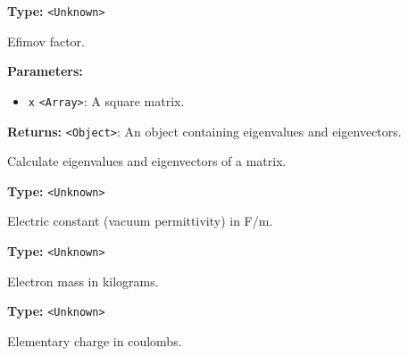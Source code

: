 \documentclass[12pt,a4paper]{article}
\begin{document}
\vspace{5mm}
\noindent {}\vspace{4mm}


\noindent \textbf{Type:} \texttt{<Unknown>}

\noindent Efimov factor.

\vspace{5mm}
\noindent {}


\noindent \textbf{Parameters:}
\begin{itemize}
  \item \texttt{x} \texttt{<Array>}: A square matrix.
\end{itemize}

\noindent \textbf{Returns:} \texttt{<Object>}: An object containing eigenvalues and eigenvectors.

\noindent Calculate eigenvalues and eigenvectors of a matrix.

\vspace{5mm}
\noindent {}\vspace{4mm}


\noindent \textbf{Type:} \texttt{<Unknown>}

\noindent Electric constant (vacuum permittivity) in F/m.

\vspace{5mm}
\noindent {}\vspace{4mm}


\noindent \textbf{Type:} \texttt{<Unknown>}

\noindent Electron mass in kilograms.

\vspace{5mm}
\noindent {}\vspace{4mm}


\noindent \textbf{Type:} \texttt{<Unknown>}

\noindent Elementary charge in coulombs.

\vspace{5mm}
\noindent {}
\end{document}
